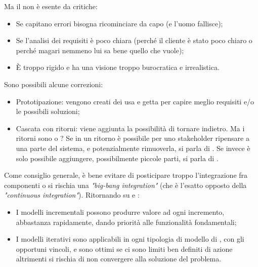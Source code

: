 \documentclass[../main]{subfiles}
\begin{document}
Ma il  non è esente da critiche:
\begin{itemize}
    \item Se capitano errori bisogna ricominciare da capo (e l'uomo fallisce);
    \item Se l'analisi dei requisiti è poco chiara (perché il cliente è stato poco chiaro o perché magari nemmeno lui sa bene quello che vuole);
    \item È troppo rigido e ha una visione troppo burocratica e irrealistica.
\end{itemize}
Sono possibili alcune correzioni:
\begin{itemize}
    \item Prototipazione: vengono creati dei  usa e getta per capire meglio requisiti e/o le possibili soluzioni;
    \item Cascata con ritorni: viene aggiunta la possibilità di tornare indietro. Ma i ritorni sono  o ? Se in un ritorno è possibile per uno stakeholder ripensare a una parte del sistema, e potenzialmente rimuoverla, si parla di . Se invece è solo possibile aggiungere, possibilmente piccole parti, si parla di .
\end{itemize}
Come consiglio generale, è bene evitare di posticipare troppo l'integrazione fra componenti o si rischia una \textit{"big-bang integration"} (che è l'esatto opposto della \textit{"continuous integration"}).\newline
Ritornando su  e :
\begin{itemize}
    \item I modelli incrementali possono produrre valore ad ogni incremento, abbastanza rapidamente, dando priorità alle funzionalità fondamentali;
    \item I modelli iterativi sono applicabili in ogni tipologia di modello di , con gli opportuni vincoli, e sono ottimi se ci sono limiti ben definiti di azione altrimenti si rischia di non convergere alla soluzione del problema.
\end{itemize}
\end{document}
